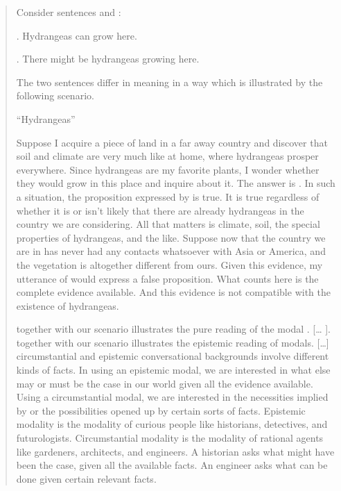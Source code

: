 \begin{quote}
	
	Consider sentences \Next and \NNext:
	
	\ex. Hydrangeas can grow here.
	
	\ex. There might be hydrangeas growing here.
	
	The two sentences differ in meaning in a way which is illustrated by
  the following scenario.
	
	\medskip ``Hydrangeas''
	
	\medskip Suppose I acquire a piece of land in a far away country and
  discover that soil and climate are very much like at home, where
  hydrangeas prosper everywhere. Since hydrangeas are my favorite
  plants, I wonder whether they would grow in this place and inquire
  about it. The answer is \LLast. In such a situation, the proposition
  expressed by \LLast is true. It is true regardless of whether it is
  or isn't likely that there are already hydrangeas in the country we
  are considering. All that matters is climate, soil, the special
  properties of hydrangeas, and the like. Suppose now that the country
  we are in has never had any contacts whatsoever with Asia or
  America, and the vegetation is altogether different from ours. Given
  this evidence, my utterance of \Last would express a false
  proposition. What counts here is the complete evidence available.
  And this evidence is not compatible with the existence of
  hydrangeas.
	
	\medskip \LLast together with our scenario illustrates the pure
   reading of the modal . [\dots
  ]. \Last together with our scenario illustrates the epistemic
  reading of modals. [\dots] circumstantial and epistemic
  conversational backgrounds involve different kinds of facts. In
  using an epistemic modal, we are interested in what else may or must
  be the case in our world given all the evidence available. Using a
  circumstantial modal, we are interested in the necessities implied
  by or the possibilities opened up by certain sorts of facts.
  Epistemic modality is the modality of curious people like
  historians, detectives, and futurologists. Circumstantial modality
  is the modality of rational agents like gardeners, architects, and
  engineers. A historian asks what might have been the case, given all
  the available facts. An engineer asks what can be done given certain
  relevant facts.
\end{quote}

